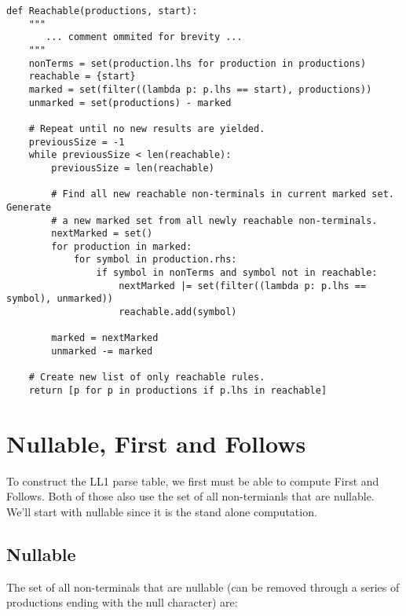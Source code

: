 \documentclass{article}
\begin{document}
\begin{verbatim}
def Reachable(productions, start):
    """
       ... comment ommited for brevity ... 
    """
    nonTerms = set(production.lhs for production in productions)
    reachable = {start}
    marked = set(filter((lambda p: p.lhs == start), productions))
    unmarked = set(productions) - marked

    # Repeat until no new results are yielded.
    previousSize = -1
    while previousSize < len(reachable):
        previousSize = len(reachable)

        # Find all new reachable non-terminals in current marked set. Generate
        # a new marked set from all newly reachable non-terminals.
        nextMarked = set()
        for production in marked:
            for symbol in production.rhs:
                if symbol in nonTerms and symbol not in reachable:
                    nextMarked |= set(filter((lambda p: p.lhs == symbol), unmarked))
                    reachable.add(symbol)

        marked = nextMarked
        unmarked -= marked

    # Create new list of only reachable rules.
    return [p for p in productions if p.lhs in reachable]
\end{verbatim}

\section{Nullable, First and Follows}
To construct the LL1 parse table, we first must be able to compute
First and Follows. Both of those also use the set of all non-termianls
that are nullable. We'll start with nullable since it is the stand alone
computation.

\subsection{Nullable}
The set of all non-terminals that are nullable (can be removed through a series of productions ending with the null character) are:
\end{document}
